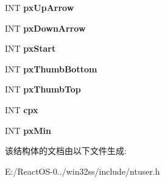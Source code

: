 \begin{DoxyCompactItemize}
I\+NT {\bfseries px\+Up\+Arrow}
\item 
\mbox{\label{structtag_s_b_c_a_l_c_aceb6df3b975eec964620071976f0cc69}} 
I\+NT {\bfseries px\+Down\+Arrow}
\item 
\mbox{\label{structtag_s_b_c_a_l_c_a819c6f087cfeaace3864118de16d3d39}} 
I\+NT {\bfseries px\+Start}
\item 
\mbox{\label{structtag_s_b_c_a_l_c_a200aaf194db0b70be159a3b0a39beb3f}} 
I\+NT {\bfseries px\+Thumb\+Bottom}
\item 
\mbox{\label{structtag_s_b_c_a_l_c_a0fee70338690cec3d0adcb53d1b39361}} 
I\+NT {\bfseries px\+Thumb\+Top}
\item 
\mbox{\label{structtag_s_b_c_a_l_c_ab50a1c17178d6282fc99f8aec1cd06c0}} 
I\+NT {\bfseries cpx}
\item 
\mbox{\label{structtag_s_b_c_a_l_c_af4d0873178967d4482da8dd2e8762f77}} 
I\+NT {\bfseries px\+Min}
\end{DoxyCompactItemize}


该结构体的文档由以下文件生成\+:\begin{DoxyCompactItemize}
\item 
E\+:/\+React\+O\+S-\/0../win32ss/include/ntuser.\+h\end{DoxyCompactItemize}
